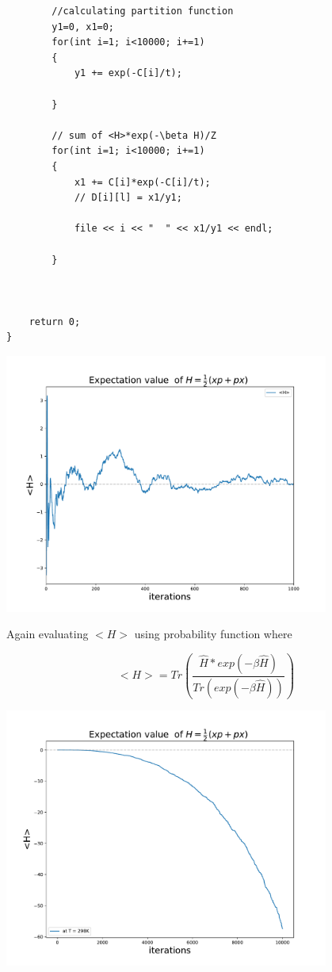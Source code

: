 \documentclass[12pt, letterpaper]{article}
\begin{document}
\begin{mdframed}[style=MyFrame]
\begin{verbatim}
        //calculating partition function
        y1=0, x1=0;
        for(int i=1; i<10000; i+=1)
        {
            y1 += exp(-C[i]/t);

        }

        // sum of <H>*exp(-\beta H)/Z 
        for(int i=1; i<10000; i+=1)
        {
            x1 += C[i]*exp(-C[i]/t);
            // D[i][l] = x1/y1;

            file << i << "  " << x1/y1 << endl;

        }



    return 0;
}
        \end{verbatim}        
    \end{mdframed}

        \begin{adjustbox}{center,caption={Graph of Expectation value of Berry-Keating},nofloat=figure,label={somelabel}}
            \includegraphics[width=0.8\textwidth]{bk.pdf}
        \end{adjustbox}

        Again evaluating $<H>$ using probability function where

        \begin{equation}
            <H> = Tr (\frac{\hat{H}*exp(-\beta \hat{H})}{Tr (exp(-\beta \hat{H} ))})
        \end{equation}
        \begin{adjustbox}{center,caption={Graph of Expectation value of Berry-Keating},nofloat=figure,label={somelabel}}
            \includegraphics[width=0.8\textwidth]{beta.pdf}
        \end{adjustbox}
\end{document}
